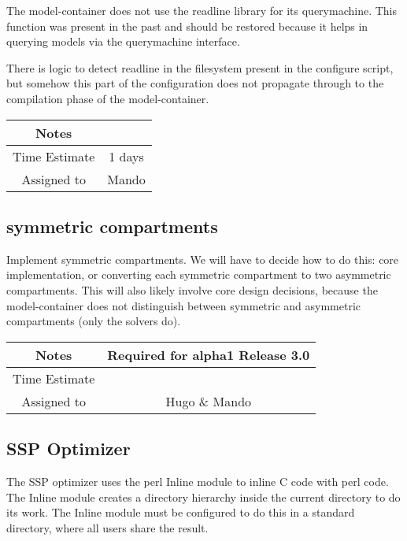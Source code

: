 \documentclass[12pt]{article}
\begin{document}
The model-container does not use the readline library for its
querymachine.  This function was present in the past and should be
restored because it helps in querying models via the querymachine
interface.

There is logic to detect readline in the filesystem present in the
configure script, but somehow this part of the configuration does not
propagate through to the compilation phase of the model-container.

{
  \vspace{5mm}
  \centering
  \begin{tabular}{|c|c|}
    \hline
    Notes
    & \\
    \hline
    Time Estimate
    & 1 days \\
    \hline
    Assigned to
    & Mando \\
    \hline
  \end{tabular}
}


\subsection{symmetric compartments}

Implement symmetric compartments.  We will have to decide how to do
this: core implementation, or converting each symmetric compartment to
two asymmetric compartments.  This will also likely involve core
design decisions, because the model-container does not distinguish
between symmetric and asymmetric compartments (only the solvers do).

{
  \vspace{5mm}
  \centering
  \begin{tabular}{|c|c|}
    \hline
    Notes
    & Required for alpha1 Release 3.0 \\
    \hline
    Time Estimate
    & \\
    \hline
    Assigned to
    & Hugo \& Mando \\
    \hline
  \end{tabular}
}


\subsection{SSP Optimizer}

The SSP optimizer uses the perl Inline module to inline C code with
perl code.  The Inline module creates a directory hierarchy inside the
current directory to do its work.  The Inline module must be
configured to do this in a standard directory, where all users share
the result.
\end{document}
